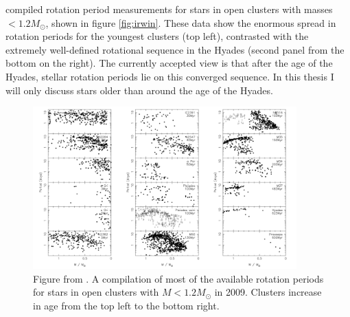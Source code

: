 \citet{Irwin2009} compiled rotation period measurements for stars in open
clusters with masses $< 1.2 M_\odot$, shown in figure \ref{fig:irwin}.
These data show the enormous spread in rotation periods for the youngest
clusters (top left), contrasted with the extremely well-defined rotational
sequence in the Hyades (second panel from the bottom on the right).
The currently accepted view is that after the age of the Hyades, stellar
rotation periods lie on this converged sequence.
In this thesis I will only discuss stars older than around the age of the
Hyades.
\begin{figure}[p]
\begin{center}
\includegraphics[width=4in, clip=true]{figures/irwin.pdf}
\caption[Cluster rotation from \citet{Irwin2009}]
{Figure from \citet{Irwin2009}. A compilation of most of the available
rotation periods for stars in open clusters with $M < 1.2 M_\odot$ in 2009.
Clusters increase in age from the top left to the bottom right.}
\label{fig:solar_spectrum}
\end{center}
\end{figure}

